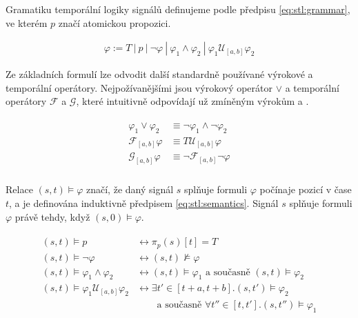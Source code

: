 Gramatiku temporální logiky signálů definujeme podle předpisu \ref{eq:stl:grammar},
ve kterém $p$ značí atomickou propozici.

\begin{align}\label{eq:stl:grammar}
\varphi := T~|~p~|~\neg\varphi~|~\varphi_1 \wedge \varphi_2~|~\varphi_1\mathcal{U}_{[a,b]}\varphi_2
\end{align}

Ze základních formulí lze odvodit další standardně používané výrokové a temporální operátory.
Nejpožívanějšími jsou výrokový operátor $\vee$ a temporální operátory $\mathcal{F}$ a $\mathcal{G}$,
které intuitivně odpovídají už zmíněným výrokům  a .

\begin{align}\label{eq:stl:other}
\begin{array}{ll}
\varphi_1\vee\varphi_2 		&\equiv \neg\varphi_1 \wedge \neg\varphi_2		\\
\mathcal{F}_{[a,b]}\varphi 	&\equiv T\mathcal{U}_{[a,b]}\varphi				\\
\mathcal{G}_{[a,b]}\varphi 	&\equiv \neg\mathcal{F}_{[a,b]}\neg\varphi		\\
\end{array}
\end{align}

Re\-la\-ce $(s, t) \models \varphi$ značí, že daný signál $s$ splňuje formuli $\varphi$
počínaje pozicí v čase $t$, a je definována induktivně předpisem \ref{eq:stl:semantics}.
Signál $s$ splňuje formuli $\varphi$ právě tehdy, když $(s, 0) \models \varphi$.

\begin{align}\label{eq:stl:semantics}
\begin{array}{ll}
(s, t) \models p				&\longleftrightarrow \pi_p(s)[t] = T			\\
(s, t) \models \neg \varphi		&\longleftrightarrow (s, t) \not\models \varphi	\\
(s, t) \models \varphi_1 \wedge \varphi_2	&\longleftrightarrow (s, t) \models \varphi_1 \textrm{ a současně } (s, t) \models \varphi_2	\\
(s, t) \models \varphi_1 \mathcal{U}_{[a,b]} \varphi_2 	&\longleftrightarrow \exists t' \in [t+a, t+b] . (s, t') \models \varphi_2			\\														
&~~~~~~~~\textrm{ a současně } \forall t'' \in [t, t'] . (s, t'') \models \varphi_1
\end{array}
\end{align}

